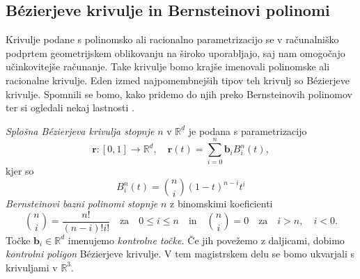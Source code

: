\documentclass[12pt,a4paper,twoside]{article}
\theoremstyle{definition} %
\theoremstyle{plain} %
\theoremstyle{primerstyle}
\numberwithin{equation}{section}  %
\newcommand{\R}{\mathbb R}
\newcommand{\bV}{\mathbf{b}}
\newcommand{\rV}{\mathbf{r}}
\begin{document}
\subsection{Bézierjeve krivulje in Bernsteinovi polinomi}
\label{bern_poli_bez_kri_poglavje}
Krivulje podane s polinomsko ali racionalno parametrizacijo se v računalniško podprtem geometrijskem oblikovanju na široko uporabljajo, saj nam omogočajo učinkovitejše računanje. Take krivulje bomo krajše imenovali polinomske ali racionalne krivulje. Eden izmed najpomembnejših tipov teh krivulj so Bézierjeve krivulje. Spomnili se bomo, kako pridemo do njih preko Bernsteinovih polinomov ter si ogledali nekaj lastnosti \cite[str.\ 75]{farin2002handbook}.

\emph{Splošna Bézierjeva krivulja stopnje} $n$ v $\R^d$ je podana s parametrizacijo
\begin{equation}
	\label{splosna_bezier}
	\rV:[0,1]\rightarrow\R^d,\quad\rV(t)=\sum_{i=0}^n\bV_iB_i^n(t),
\end{equation}
kjer so
\begin{equation}
	\label{splosni_bernstein}
	B_i^n(t)=\binom{n}{i}(1-t)^{n-i}t^i
\end{equation}
\emph{Bernsteinovi bazni polinomi stopnje} $n$ z binomskimi koeficienti
$$\binom{n}{i}=\frac{n!}{(n-i)!i!}\quad\text{za}\quad 0\leq i \leq n\quad\text{in}\quad\binom{n}{i}=0\quad\text{za}\quad i>n,\quad i<0.$$
Točke $\bV_i\in\R^d$ imenujemo \emph{kontrolne točke.} Če jih povežemo z daljicami, dobimo \emph{kontrolni poligon} Bézierjeve krivulje. V tem magistrskem delu se bomo ukvarjali s krivuljami v $\R^3.$
\pagebreak
\end{document}
